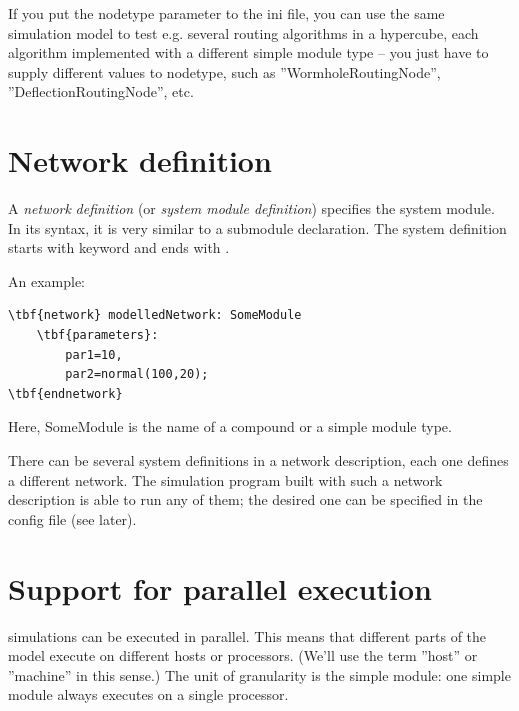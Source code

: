 If you put the nodetype parameter to the ini file, you can use the
same simulation model to test e.g. several routing algorithms in a
hypercube, each algorithm implemented with a different
simple module type -- you just have to supply
different values to nodetype, such as ''WormholeRoutingNode'',
''DeflectionRoutingNode'', etc.





\section{Network definition}


A \textit{network} \textit{definition} (or \textit{system module
  definition}) specifies the system module. In its syntax, it is very
similar to a submodule declaration. The system definition starts with
keyword  and ends with
.


An example:


\begin{Verbatim}[commandchars=\\\{\}]
\tbf{network} modelledNetwork: SomeModule
    \tbf{parameters}:
        par1=10,
        par2=normal(100,20);
\tbf{endnetwork}
\end{Verbatim}


Here, SomeModule is the name of a compound or a simple module type.


There can be several system definitions in a network description, 
each one defines a different network. The simulation program 
built with such a network description is able to run any of them; 
the desired one can be specified in the config file (see later).





\section{Support for parallel execution}

\opp simulations can be executed in parallel. This means that different parts of the model execute on
different hosts or processors.  (We'll use the term ''host'' or
''machine'' in this sense.) The unit of granularity is the
simple module: one simple
module always executes on a single processor.


